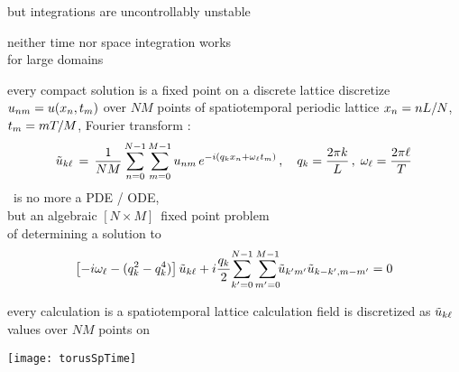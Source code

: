 \begin{frame}{but integrations are uncontrollably unstable}
\begin{center}
{\huge neither} time {\huge nor} space integration {\huge works} \\
for large domains
\end{center}

\vfill
\color{red}{rethink the calculation}
\end{frame}


\begin{frame}{every compact solution is a fixed point on a discrete lattice}
discretize $u_{nm} = u(x_n,t_m)$ over
$N M$ points of spatiotemporal periodic lattice $x_n = n L/N$,
 $t_m = m {T_{}}/M$, Fourier transform :
%
\[
\tilde{u}_{k\ell} \,=\,
  \frac{1}{NM} \sum^{N-1}_{n=0} \sum^{M-1}_{m=0}
  u_{nm} \, e^{-i(q_kx_n + \omega_\ell t_m)}
    \,,\quad
q_k = \frac{2 \pi k}{L}
    \,,\;
\omega_\ell = \frac{2 \pi \ell}{{T_{}}}
\]
\KS\ is no more a PDE / ODE, \\
but an algebraic $[N\!\times\!M]$\dmn\ fixed point problem \\
of determining a solution to
\[
\left[- i \omega_\ell - ( q_k^2 - q_k^4 ) \right]\tilde{u}_{k\ell}
+ i \frac{q_k}{2} \!\sum_{k'=0}^{N-1} \sum^{M-1}_{m'=0}\!\!
\tilde{u}_{k'm'} \tilde{u}_{k-k',m-m'}
    =
0
\]
\end{frame}

\begin{frame}{every calculation is a spatiotemporal lattice calculation}
field is discretized as
$\tilde{u}_{k\ell}$ values  over
$N M$ points on

\begin{center}
\texttt{[image: torusSpTime]}
\end{center}
\end{frame}


